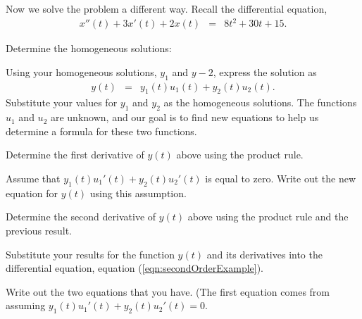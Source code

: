 \begin{problem}

\item Now we solve the problem a different way. Recall the
  differential equation,
  \begin{eqnarray*}
    x''(t) + 3x'(t) + 2x(t) & = & 8 t^2 + 30t + 15.
  \end{eqnarray*}

  \begin{subproblem}
    \item Determine the homogeneous solutions:
      \vspace*{4em}

    \item Using your homogeneous solutions, $y_1$ and $y-2$, express
      the solution as
    \begin{eqnarray*}
      y(t) & = & y_1(t) u_1(t) + y_2(t) u_2(t).
    \end{eqnarray*}
    Substitute your values for $y_1$ and $y_2$ as the homogeneous
    solutions. The functions $u_1$ and $u_2$ are unknown, and our goal
    is to find new equations to help us determine a formula for these
    two functions.

    \vspace{2em}

  \item Determine the first derivative of $y(t)$ above using the
    product rule.

    \vfill

  \item Assume that $y_1(t) u_1'(t) + y_2(t) u_2'(t)$ is equal to
    zero. Write out the new equation for $y(t)$ using this assumption.

    \vfill

  \item Determine the second derivative of $y(t)$ above using the
    product rule and the previous result.

    \vfill

    \clearpage

  \item Substitute your results for the function $y(t)$ and its
    derivatives into the differential equation, equation
    (\ref{eqn:secondOrderExample}).

    \vfill

  \item Write out the two equations that you have. (The first equation
    comes from assuming $y_1(t) u_1'(t) + y_2(t) u_2'(t)=0$.


\end{subproblem}
\end{problem}
